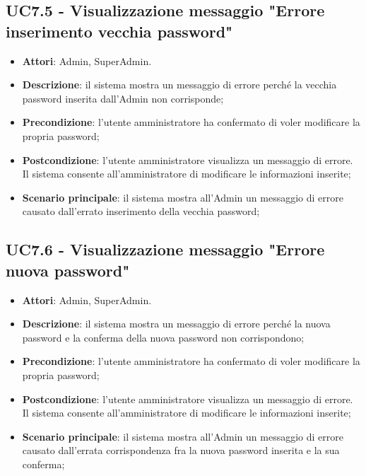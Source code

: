 \documentclass[../AnalisiDeiRequisiti_v4.0.0.tex]{subfiles}
\begin{document}
\subsection{UC7.5 - Visualizzazione messaggio "Errore inserimento vecchia password"} 
\label{sssec:UC7.5} 
\begin{itemize} 
\item \textbf{Attori}: Admin, SuperAdmin.
\item \textbf{Descrizione}: il sistema mostra un messaggio di errore perché la vecchia password inserita dall'Admin non corrisponde;
\item \textbf{Precondizione}: l'utente amministratore ha confermato di voler modificare la propria password;
\item \textbf{Postcondizione}: l'utente amministratore visualizza un messaggio di errore. Il sistema consente all'amministratore di modificare le informazioni inserite;
\item \textbf{Scenario principale}: il sistema mostra all'Admin un messaggio di errore causato dall'errato inserimento della vecchia password;
\end{itemize} 
\subsection{UC7.6 - Visualizzazione messaggio "Errore nuova password"} 
\label{sssec:UC7.6} 
\begin{itemize} 
\item \textbf{Attori}: Admin, SuperAdmin.
\item \textbf{Descrizione}: il sistema mostra un messaggio di errore perché la nuova password e la conferma della nuova password non corrispondono;
\item \textbf{Precondizione}: l'utente amministratore ha confermato di voler modificare la propria password;
\item \textbf{Postcondizione}: l'utente amministratore visualizza un messaggio di errore. Il sistema consente all'amministratore di modificare le informazioni inserite;
\item \textbf{Scenario principale}: il sistema mostra all'Admin un messaggio di errore causato dall'errata corrispondenza fra la nuova password inserita e la sua conferma;

\end{itemize} 
\newpage
\end{document}
